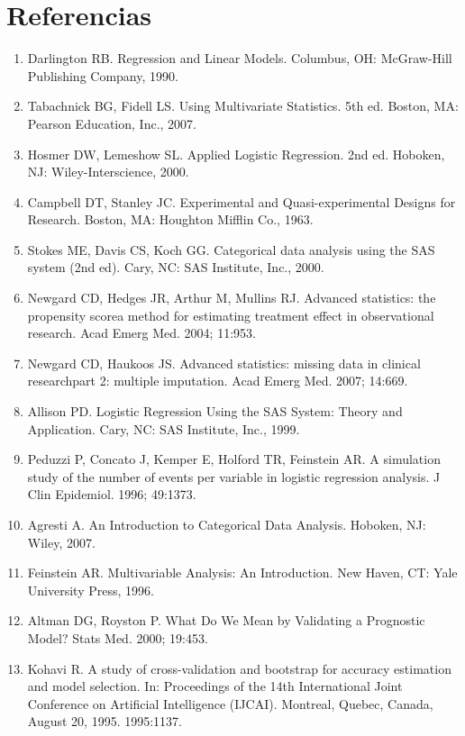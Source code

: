\documentclass[12pt]{article}
\begin{document}
\section*{Referencias}
\begin{enumerate}
  \item Darlington RB. Regression and Linear Models. Columbus, OH: McGraw-Hill Publishing Company, 1990.
  \item Tabachnick BG, Fidell LS. Using Multivariate Statistics. 5th ed. Boston, MA: Pearson Education, Inc., 2007.
  \item Hosmer DW, Lemeshow SL. Applied Logistic Regression. 2nd ed. Hoboken, NJ: Wiley-Interscience, 2000.
  \item Campbell DT, Stanley JC. Experimental and Quasi-experimental Designs for Research. Boston, MA: Houghton Mifflin Co., 1963.
  \item Stokes ME, Davis CS, Koch GG. Categorical data analysis using the SAS system (2nd ed). Cary, NC: SAS Institute, Inc., 2000.
  \item Newgard CD, Hedges JR, Arthur M, Mullins RJ. Advanced statistics: the propensity score\textendash a method for estimating treatment effect in observational research. Acad Emerg Med. 2004; 11:953.
  \item Newgard CD, Haukoos JS. Advanced statistics: missing data in clinical research\textendash part 2: multiple imputation. Acad Emerg Med. 2007; 14:669.
  \item Allison PD. Logistic Regression Using the SAS System: Theory and Application. Cary, NC: SAS Institute, Inc., 1999.
  \item Peduzzi P, Concato J, Kemper E, Holford TR, Feinstein AR. A simulation study of the number of events per variable in logistic regression analysis. J Clin Epidemiol. 1996; 49:1373.
  \item Agresti A. An Introduction to Categorical Data Analysis. Hoboken, NJ: Wiley, 2007.
  \item Feinstein AR. Multivariable Analysis: An Introduction. New Haven, CT: Yale University Press, 1996.
  \item Altman DG, Royston P. What Do We Mean by Validating a Prognostic Model? Stats Med. 2000; 19:453.
  \item Kohavi R. A study of cross-validation and bootstrap for accuracy estimation and model selection. In: Proceedings of the 14th International Joint Conference on Artificial Intelligence (IJCAI). Montreal, Quebec, Canada, August 20, 1995. 1995:1137.

\end{enumerate}
\end{document}
